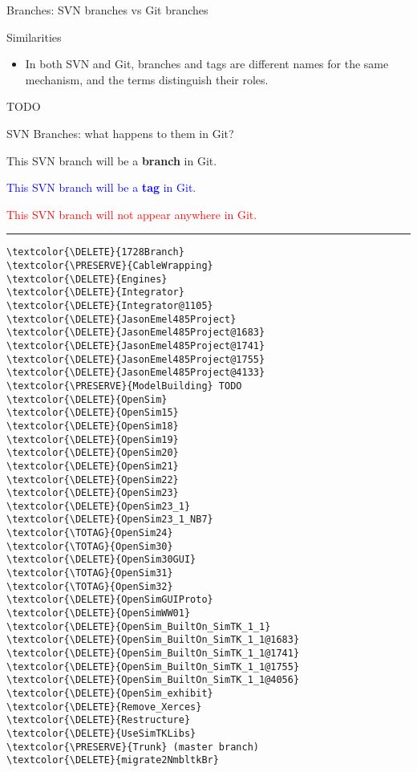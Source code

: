 \documentclass[pdf, 8pt]{beamer}
\def\DELETE{red}
\def\PRESERVE{green!60!black}
\def\TOTAG{blue}
\begin{document}
\begin{frame}{Branches: SVN branches vs Git branches}

Similarities
\begin{itemize}
    \item In both SVN and Git, branches and tags are different names for the
    same mechanism, and the terms distinguish their roles.
\end{itemize}

TODO


\end{frame}

\begin{frame}[fragile]{SVN Branches: what happens to them in Git?}

\textcolor{\PRESERVE}{This SVN branch will be a \textbf{branch} in Git.}

\textcolor{\TOTAG}{This SVN branch will be a \textbf{tag} in Git.}

\textcolor{\DELETE}{This SVN branch will not appear anywhere in Git.}

\hrule
\begin{multicols}{2}
\begin{Verbatim}
\textcolor{\DELETE}{1728Branch}
\textcolor{\PRESERVE}{CableWrapping}
\textcolor{\DELETE}{Engines}
\textcolor{\DELETE}{Integrator}
\textcolor{\DELETE}{Integrator@1105}
\textcolor{\DELETE}{JasonEmel485Project}
\textcolor{\DELETE}{JasonEmel485Project@1683}
\textcolor{\DELETE}{JasonEmel485Project@1741}
\textcolor{\DELETE}{JasonEmel485Project@1755}
\textcolor{\DELETE}{JasonEmel485Project@4133}
\textcolor{\PRESERVE}{ModelBuilding} TODO
\textcolor{\DELETE}{OpenSim}
\textcolor{\DELETE}{OpenSim15}
\textcolor{\DELETE}{OpenSim18}
\textcolor{\DELETE}{OpenSim19}
\textcolor{\DELETE}{OpenSim20}
\textcolor{\DELETE}{OpenSim21}
\textcolor{\DELETE}{OpenSim22}
\textcolor{\DELETE}{OpenSim23}
\textcolor{\DELETE}{OpenSim23_1}
\textcolor{\DELETE}{OpenSim23_1_NB7}
\textcolor{\TOTAG}{OpenSim24}
\textcolor{\TOTAG}{OpenSim30}
\textcolor{\DELETE}{OpenSim30GUI}
\textcolor{\TOTAG}{OpenSim31}
\textcolor{\TOTAG}{OpenSim32}
\textcolor{\DELETE}{OpenSimGUIProto}
\textcolor{\DELETE}{OpenSimWW01}
\textcolor{\DELETE}{OpenSim_BuiltOn_SimTK_1_1}
\textcolor{\DELETE}{OpenSim_BuiltOn_SimTK_1_1@1683}
\textcolor{\DELETE}{OpenSim_BuiltOn_SimTK_1_1@1741}
\textcolor{\DELETE}{OpenSim_BuiltOn_SimTK_1_1@1755}
\textcolor{\DELETE}{OpenSim_BuiltOn_SimTK_1_1@4056}
\textcolor{\DELETE}{OpenSim_exhibit}
\textcolor{\DELETE}{Remove_Xerces}
\textcolor{\DELETE}{Restructure}
\textcolor{\DELETE}{UseSimTKLibs}
\textcolor{\PRESERVE}{Trunk} (master branch)
\textcolor{\DELETE}{migrate2NmbltkBr}
\end{Verbatim}
\end{multicols}
\end{frame}
\end{document}
